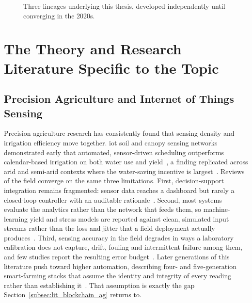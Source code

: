 \documentclass[12pt,a4paper,oneside]{book}
\begin{document}
\begin{figure}[htbp]
  \caption{Three lineages underlying this thesis, developed independently
           until converging in the 2020s.}
  \label{fig:lit-timeline}
\end{figure}

\section{The Theory and Research Literature Specific to the Topic}
\label{sec:lit_specific}

\subsection{Precision Agriculture and Internet of Things Sensing}
\label{subsec:lit_precision_ag}

Precision agriculture research has consistently found that sensing density
and irrigation efficiency move together. \gls{iot} soil and canopy sensing
networks demonstrated early that automated, sensor-driven scheduling
outperforms calendar-based irrigation on both water use and
yield~\cite{rathi2025smart, brooks2019precisionWater, chatterjee2023precision,
gondchawar2016agriculture4}, a finding replicated across arid and
semi-arid contexts where the water-saving incentive is
largest~\cite{williams2022savings, miller2020climateImpact,
garrido2018mediterranean}. Reviews of the field converge on the same three
limitations. First, decision-support integration remains
fragmented: sensor data reaches a dashboard but rarely a closed-loop
controller with an auditable
rationale~\cite{aydin2021comprehensive, zhang2002precision,
gebbers2010precision, mcbratney2005future}. Second, most systems evaluate
the analytics rather than the network that feeds them, so machine-learning
yield and stress models are reported against clean, simulated input streams
rather than the loss and jitter that a field deployment actually
produces~\cite{chlingaryan2018machine, goap2018iot, mohanty2016using,
van2020review}. Third, sensing accuracy in the field degrades in ways a
laboratory calibration does not capture, drift, fouling and intermittent
failure among them, and few studies report the resulting error
budget~\cite{akhtar2019sensingAccuracy, agri2024sensorAccuracy,
garcia2021sensorFailures, lopez2023remoteFailure}. Later generations of this
literature push toward higher automation, describing four- and
five-generation smart-farming stacks that assume the identity and integrity
of every reading rather than establishing
it~\cite{suleiman2025agriculture5, owusu2025iotAgri, yang2021iotSensing,
singh2019iotSmartIrrigation, jin2025productivity}. That assumption is exactly
the gap Section~\ref{subsec:lit_blockchain_ag} returns to.
\end{document}
